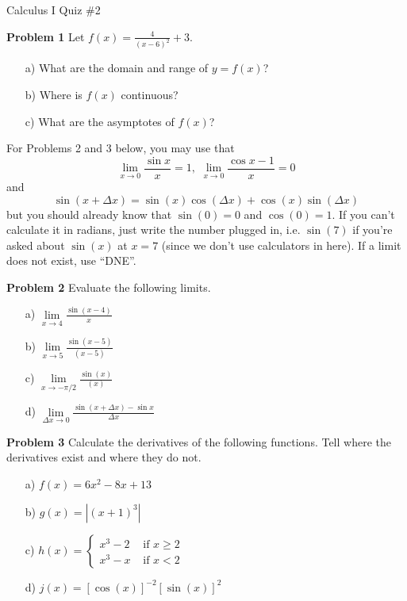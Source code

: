 \documentclass[10pt]{article}
\begin{document}


\begin{center}
Calculus I Quiz \#2
\end{center}

\noindent\textbf{Problem 1} Let $f(x) = \frac{4}{(x-6)^2} + 3$.
\begin{itemize}
\item[a) ] What are the domain and range of $y = f(x)$? 
\item[b) ] Where is $f(x)$ continuous? 
\item[c) ] What are the asymptotes of $f(x)$? 
\end{itemize}

\vspace{25mm}

\noindent For Problems 2 and 3 below, you may use that 
\[ \lim_{x \to 0} \frac{\sin x}{x} = 1, \,\, \lim_{x \to 0} \frac{\cos x - 1}{x} = 0 \]
and 
\[ \sin(x + \Delta x) = \sin(x) \cos(\Delta x) + \cos(x) \sin(\Delta x) \]
but you should already know that $\sin(0) = 0$ and $\cos(0) = 1$. If you can't calculate it in radians, just write the number plugged in, i.e. $\sin(7)$ if you're asked about $\sin(x)$ at $x=7$ (since we don't use calculators in here). If a limit does not exist, use ``DNE''.

\vspace{10mm}

\noindent\textbf{Problem 2} 
Evaluate the following limits. 
\begin{itemize}
\item[a) ] $\lim\limits_{x \to 4} \frac{\sin(x-4)}{x}$
\item[b) ] $\lim\limits_{x \to 5} \frac{\sin(x-5)}{(x-5)}$
\item[c) ] $\lim\limits_{x \to -\pi/2} \frac{\sin(x)}{(x)}$
\item[d) ] $\lim\limits_{\Delta x \to 0} \frac{\sin (x + \Delta x) - \sin x}{\Delta x}$
\end{itemize}

\vspace{25mm}

\noindent\textbf{Problem 3} Calculate the derivatives of the following functions. Tell where the derivatives exist and where they do not.
\begin{itemize}
\item[a) ] $f(x) = 6x^2 - 8x + 13$
\item[b) ] $g(x) = |(x+1)^3|$
\item[c) ] $h(x) = \left\{\begin{array}{ll} x^3 - 2 & \text{ if } x \geq 2 \\ x^3 - x & \text{ if } x < 2 \end{array}\right.$
\item[d) ] $j(x) = [\cos(x)]^{-2} [\sin(x)]^2$ 
\end{itemize}
\end{document}
